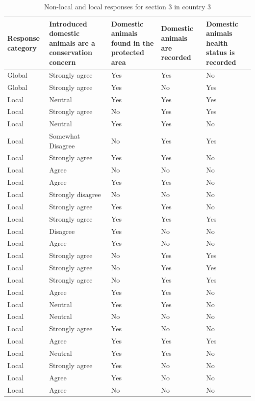 \documentclass[
  letterpaper,
  DIV=11,
  numbers=noendperiod]{scrartcl}
\begin{document}
\begin{table}[H]

\caption{Non-local and local responses for section 3 in country 3}
\centering
\begin{tabular}[t]{>{\raggedright\arraybackslash}p{2cm}|>{\raggedright\arraybackslash}p{3cm}|>{\raggedright\arraybackslash}p{2cm}|>{\raggedright\arraybackslash}p{2cm}|>{\raggedright\arraybackslash}p{2cm}}
\hline
Response
category & Introduced domestic
animals are
a conservation
concern & Domestic animals
found in the
protected area & Domestic animals
are recorded & Domestic animals
health status
is recorded\\
\hline
Global & Strongly agree & Yes & Yes & No\\
\hline
Global & Strongly agree & Yes & No & Yes\\
\hline
Local & Neutral & Yes & Yes & Yes\\
\hline
Local & Strongly agree & No & Yes & \vphantom{3} Yes\\
\hline
Local & Neutral & Yes & Yes & \vphantom{2} No\\
\hline
Local & Somewhat Disagree & No & Yes & Yes\\
\hline
Local & Strongly agree & Yes & Yes & \vphantom{1} No\\
\hline
Local & Agree & No & No & \vphantom{1} No\\
\hline
Local & Agree & Yes & Yes & \vphantom{1} No\\
\hline
Local & Strongly disagree & No & No & No\\
\hline
Local & Strongly agree & Yes & Yes & No\\
\hline
Local & Strongly agree & Yes & Yes & Yes\\
\hline
Local & Disagree & Yes & No & No\\
\hline
Local & Agree & Yes & No & \vphantom{1} No\\
\hline
Local & Strongly agree & No & Yes & \vphantom{2} Yes\\
\hline
Local & Strongly agree & No & Yes & \vphantom{1} Yes\\
\hline
Local & Strongly agree & No & Yes & Yes\\
\hline
Local & Agree & Yes & Yes & No\\
\hline
Local & Neutral & Yes & Yes & \vphantom{1} No\\
\hline
Local & Neutral & No & No & No\\
\hline
Local & Strongly agree & Yes & No & \vphantom{1} No\\
\hline
Local & Agree & Yes & Yes & Yes\\
\hline
Local & Neutral & Yes & Yes & No\\
\hline
Local & Strongly agree & Yes & No & No\\
\hline
Local & Agree & Yes & No & No\\
\hline
Local & Agree & No & No & No\\
\hline
\end{tabular}
\end{table}
\end{document}
